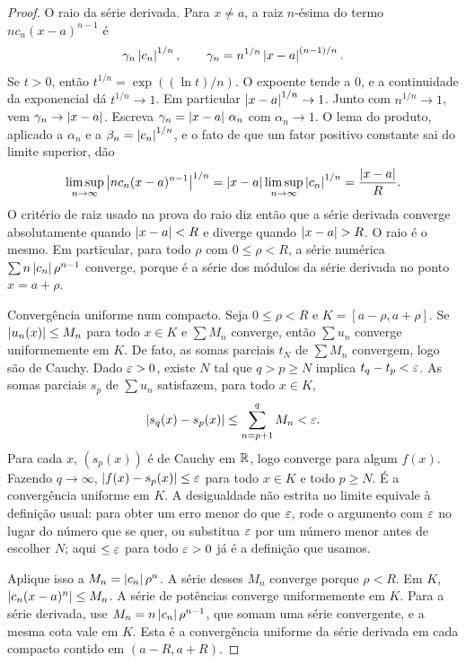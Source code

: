 \documentclass[11pt,a4paper]{article}
\begin{document}
\begin{proof}
O raio da série derivada. Para \(x\neq a\), a raiz \(n\)-ésima do termo \(n c_n(x-a)^{n-1}\) é
\[
\gamma_n\left\lvert c_n \right\rvert^{1/n},
\qquad
\gamma_n=n^{1/n}\left\lvert x-a \right\rvert^{(n-1)/n}.
\]
Se \(t>0\), então \(t^{1/n}=\exp((\ln t)/n)\). O expoente tende a \(0\), e a continuidade da exponencial dá \(t^{1/n}\to 1\). Em particular \(\left\lvert x-a \right\rvert^{1/n}\to 1\). Junto com \(n^{1/n}\to 1\), vem \(\gamma_n\to\left\lvert x-a \right\rvert\). Escreva \(\gamma_n=\left\lvert x-a \right\rvert\,\alpha_n\) com \(\alpha_n\to 1\). O lema do produto, aplicado a \(\alpha_n\) e a \(\beta_n=\left\lvert c_n \right\rvert^{1/n}\), e o fato de que um fator positivo constante sai do limite superior, dão
\[
\limsup_{n\to\infty}\left\lvert n c_n(x-a)^{n-1} \right\rvert^{1/n}
=\left\lvert x-a \right\rvert\limsup_{n\to\infty}\left\lvert c_n \right\rvert^{1/n}
=\frac{\left\lvert x-a \right\rvert}{R}.
\]
O critério de raiz usado na prova do raio diz então que a série derivada converge absolutamente quando \(\left\lvert x-a \right\rvert<R\) e diverge quando \(\left\lvert x-a \right\rvert>R\). O raio é o mesmo. Em particular, para todo \(\rho\) com \(0\le\rho<R\), a série numérica \(\sum n\left\lvert c_n \right\rvert\rho^{n-1}\) converge, porque é a série dos módulos da série derivada no ponto \(x=a+\rho\).

Convergência uniforme num compacto. Seja \(0\le\rho<R\) e \(K=[a-\rho,a+\rho]\). Se \(\left\lvert u_n(x) \right\rvert\le M_n\) para todo \(x\in K\) e \(\sum M_n\) converge, então \(\sum u_n\) converge uniformemente em \(K\). De fato, as somas parciais \(t_N\) de \(\sum M_n\) convergem, logo são de Cauchy. Dado \(\varepsilon>0\), existe \(N\) tal que \(q>p\ge N\) implica \(t_q-t_p<\varepsilon\). As somas parciais \(s_p\) de \(\sum u_n\) satisfazem, para todo \(x\in K\),
\[
\left\lvert s_q(x)-s_p(x) \right\rvert\le\sum_{n=p+1}^{q} M_n<\varepsilon.
\]
Para cada \(x\), \((s_p(x))\) é de Cauchy em \(\mathbb{R}\), logo converge para algum \(f(x)\). Fazendo \(q\to\infty\), \(\left\lvert f(x)-s_p(x) \right\rvert\le\varepsilon\) para todo \(x\in K\) e todo \(p\ge N\). É a convergência uniforme em \(K\). A desigualdade não estrita no limite equivale à definição usual: para obter um erro menor do que \(\varepsilon\), rode o argumento com \(\varepsilon\) no lugar do número que se quer, ou substitua \(\varepsilon\) por um número menor antes de escolher \(N\); aqui \(\le\varepsilon\) para todo \(\varepsilon>0\) já é a definição que usamos.

Aplique isso a \(M_n=\left\lvert c_n \right\rvert\rho^n\). A série desses \(M_n\) converge porque \(\rho<R\). Em \(K\), \(\left\lvert c_n(x-a)^n \right\rvert\le M_n\). A série de potências converge uniformemente em \(K\). Para a série derivada, use \(M_n=n\left\lvert c_n \right\rvert\rho^{n-1}\), que somam uma série convergente, e a mesma cota vale em \(K\). Esta é a convergência uniforme da série derivada em cada compacto contido em \((a-R,a+R)\).


\end{proof}
\end{document}
